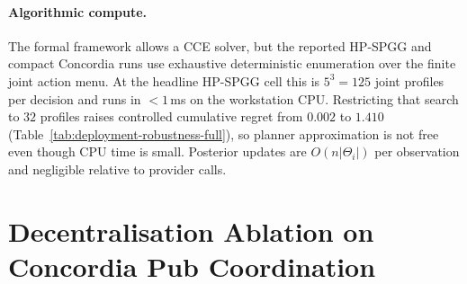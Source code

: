 \paragraph{Algorithmic compute.} The formal framework allows a CCE solver, but the reported HP-SPGG and compact Concordia runs use exhaustive deterministic enumeration over the finite joint action menu. At the headline HP-SPGG cell this is $5^3{=}125$ joint profiles per decision and runs in $<1$\,ms on the workstation CPU. Restricting that search to $32$ profiles raises controlled cumulative regret from $0.002$ to $1.410$ (Table~\ref{tab:deployment-robustness-full}), so planner approximation is not free even though CPU time is small. Posterior updates are $O(n|\Theta_i|)$ per observation and negligible relative to provider calls.



\section{Decentralisation Ablation on Concordia Pub Coordination}
\label{app:decentralization}

